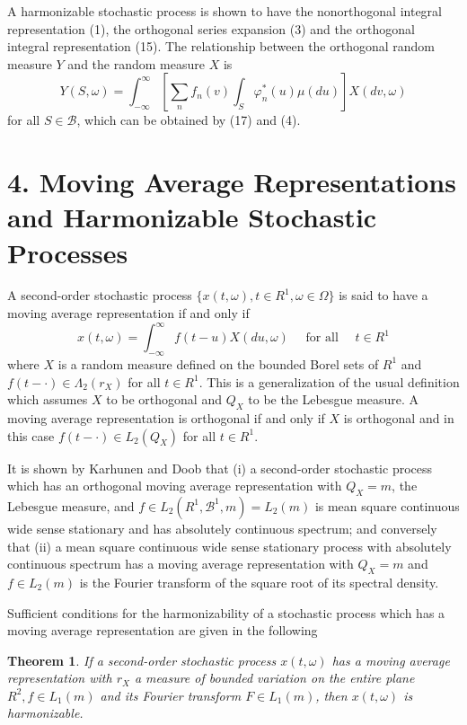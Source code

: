 \documentclass{article}
\newtheorem{theorem}{Theorem}
\begin{document}
A harmonizable stochastic process is shown to have the nonorthogonal integral representation (1), the orthogonal series expansion (3) and the orthogonal integral representation (15). The relationship between the orthogonal random measure $Y$ and the random measure $X$ is
\[
Y(S, \omega)=\int_{-\infty}^{\infty}\left[\sum_{n} f_{n}(v) \int_{S} \varphi_{n}^{*}(u) \mu(d u)\right] X(d v, \omega)
\]
for all $S \in \mathscr{B}$, which can be obtained by (17) and (4).

\section*{4. Moving Average Representations and Harmonizable Stochastic Processes}

A second-order stochastic process $\{x(t, \omega), t \in R^{1}, \omega \in \Omega\}$ is said to have a moving average representation if and only if
\[
x(t, \omega)=\int_{-\infty}^{\infty} f(t-u) X(d u, \omega) \quad \text{ for all } \quad t \in R^{1}
\]
where $X$ is a random measure defined on the bounded Borel sets of $R^{1}$ and $f(t-\cdot) \in \Lambda_{2}(r_{X})$ for all $t \in R^{1}$. This is a generalization of the usual definition which assumes $X$ to be orthogonal and $Q_{X}$ to be the Lebesgue measure. A moving average representation is orthogonal if and only if $X$ is orthogonal and in this case $f(t-\cdot) \in L_{2}(Q_{X})$ for all $t \in R^{1}$.

It is shown by Karhunen \cite{karhunen1947} and Doob \cite{doob1953} that (i) a second-order stochastic process which has an orthogonal moving average representation with $Q_{X}=m$, the Lebesgue measure, and $f \in L_{2}(R^{1}, \mathscr{B}^{1}, m)=L_{2}(m)$ is mean square continuous wide sense stationary and has absolutely continuous spectrum; and conversely that (ii) a mean square continuous wide sense stationary process with absolutely continuous spectrum has a moving average representation with $Q_{X}=m$ and $f \in L_{2}(m)$ is the Fourier transform of the square root of its spectral density.

Sufficient conditions for the harmonizability of a stochastic process which has a moving average representation are given in the following

\begin{theorem}
If a second-order stochastic process $x(t, \omega)$ has a moving average representation with $r_{X}$ a measure of bounded variation on the entire plane $R^{2}, f \in L_{1}(m)$ and its Fourier transform $F \in L_{1}(m)$, then $x(t, \omega)$ is harmonizable.
\end{theorem}
\end{document}
